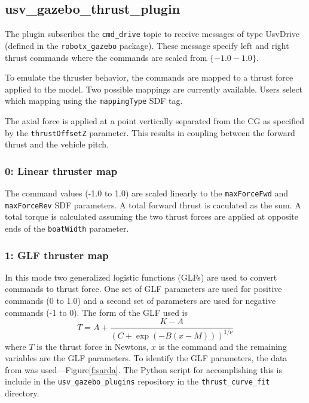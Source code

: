 \documentclass[11pt]{article}
\begin{document}
\subsection{usv\_gazebo\_thrust\_plugin}
The plugin subscribes the \verb+cmd_drive+ topic to receive messages of type UsvDrive (defined in the \verb+robotx_gazebo+ package).  These message specify left and right thrust commands where the commands are scaled from $\{-1.0-1.0\}$. 

To emulate the thruster behavior, the commands are mapped to a thrust force applied to the model.  Two possible mappings are currently available.  Users select which mapping using the \verb+mappingType+ SDF tag.

The axial force is applied at a point vertically separated from the CG as specified by the \texttt{thrustOffsetZ} parameter.  This results in coupling between the forward thrust and the vehicle pitch.

\subsubsection{0: Linear thruster map}
The command values (-1.0 to 1.0) are scaled linearly to the \texttt{maxForceFwd} and \texttt{maxForceRev} SDF parameters.  A total forward thrust is caculated as the sum.  A total torque is calculated assuming the two thrust forces are applied at opposite ends of the \texttt{boatWidth} parameter.

\subsubsection{1: GLF thruster map}

In this mode two generalized logistic functions (GLFs) are used to convert commands to thrust force.  One set of GLF parameters are used for positive commands (0 to 1.0) and a second set of parameters are used for negative commands (-1 to 0).  The form of the GLF used is
\begin{equation}
  T = A + \frac{K-A}{\left(C+\exp(-B(x-M))\right)^{1/\nu}}
\end{equation}
where $T$ is the thrust force in Newtons, $x$ is the command and the remaining variables are the GLF parameters.  To identify the GLF parameters, the data from 
\cite{sarda17station} was used---Figure\ref{f:sarda}.  The Python script for accomplishing this is include in the \verb+usv_gazebo_plugins+ repository in the \verb+thrust_curve_fit+ directory.
\end{document}
